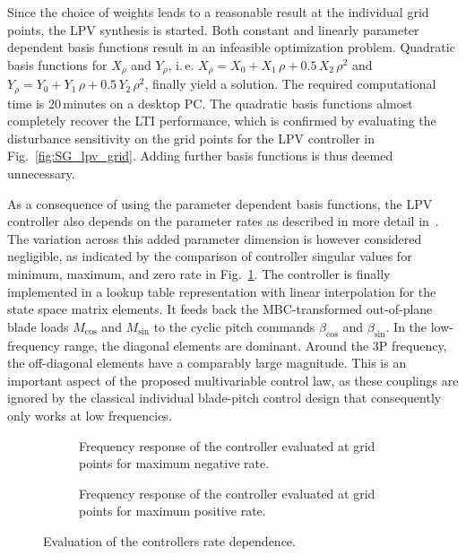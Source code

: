\documentclass[times]{weauth}
\begin{document}
 
Since the choice of weights leads to a reasonable result at the individual grid points, the LPV synthesis is started. Both constant and linearly parameter dependent basis functions result in an infeasible optimization problem.
Quadratic basis functions for $X_\rho$ and $Y_\rho$, 
i.\,e.  $X_\rho = X_0 + X_1\,\rho + 0.5\,X_2\,\rho^2$ and $Y_\rho = Y_0 + Y_1\,\rho + 0.5\,Y_2\,\rho^2$,
finally yield a solution. The required computational time is 20\,minutes on a desktop PC. The quadratic basis functions almost completely recover the LTI performance, which is confirmed by evaluating the disturbance sensitivity on the grid points for the LPV controller in Fig.~\ref{fig:SG_lpv_grid}. Adding further basis functions is thus deemed unnecessary.  


As a consequence of using the parameter dependent basis functions, the LPV controller also depends on the parameter rates as described in more detail in~\cite{Wu95}. 
The variation across this added parameter dimension is however considered negligible, as indicated by the comparison of controller singular values for minimum, maximum, and zero rate in Fig.~\ref{fig:ratedependence}. The controller is finally implemented in a lookup table representation with linear interpolation for the state space matrix elements.
It feeds back the MBC-transformed out-of-plane blade loads $M_{\cos}$  and $M_{\sin}$ to the cyclic pitch commands $\beta_{\cos}$  and $\beta_{\sin}$. In the low-frequency range, the diagonal elements are dominant. Around the 3P frequency, the off-diagonal elements have a comparably large magnitude. This is an important aspect of the proposed multivariable control law, as these couplings are ignored by the classical individual blade-pitch control design that consequently only works at low frequencies.


\begin{figure}[t]
\begin{subfigure}{0.45\linewidth} 
\centering
		 
\caption{Frequency response of the controller evaluated at grid points for maximum negative rate.}
\end{subfigure}
\hfill
\begin{subfigure}{0.45\linewidth}
\centering
		 
\caption{Frequency response of the controller evaluated at grid points for maximum positive rate.}
\end{subfigure}
\caption{Evaluation of the controllers rate dependence.}\label{fig:ratedependence}
\end{figure} 
\end{document}
